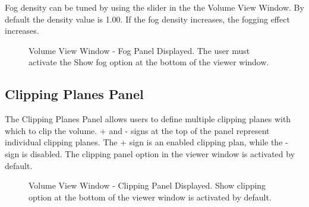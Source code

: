 \documentclass[fleqn,11pt,openany]{book}
\begin{document}
Fog density can be tuned by using the slider in the the Volume View Window.  
By default the density value is 1.00.
If the fog density increases, the fogging effect increases.
\begin{figure}[t]
\caption{Volume View Window - Fog Panel Displayed. The user must activate the Show fog option at the bottom of the viewer window.}\label{fig:FogPanel}
\end{figure}

\subsection{Clipping Planes Panel}
The Clipping Planes Panel allows users to define multiple clipping planes with which to clip the volume.  
+ and - signs at the top of the panel represent individual clipping planes.  
The + sign is an enabled clipping plan, while the - sign is disabled.
The clipping panel option in the viewer window is activated by default.

\begin{figure}[b!]
\caption{Volume View Window - Clipping Panel Displayed. Show clipping option at the bottom of the viewer window is activated by default.}\label{fig:ClippingPanel}
\end{figure}
\end{document}
